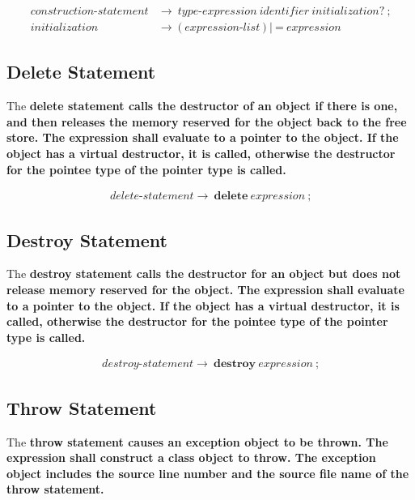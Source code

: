 \documentclass[a4paper,oneside,11pt]{article}
\begin{document}
\begin{align*}
construction\textrm{-}statement &\rightarrow \> \hyperref[typeexpr]{type\textrm{-}expression} \>
\hyperref[identifier]{identifier} \> initialization? \> \texttt{;}\\
initialization &\rightarrow \> \texttt{(} \> \hyperref[expressionlist]{expression\textrm{-}list} \> \texttt{)} \> | \> \texttt{=} \> \hyperref[expression]{expression}
\end{align*}

\subsection{Delete Statement}\label{deletestatement}

The \bf{delete} statement calls the destructor of an object if there is one, and then releases the memory reserved for the object back to the free store.
The expression shall evaluate to a pointer to the object.
If the object has a virtual destructor, it is called, otherwise the destructor for the pointee type of the pointer type is called.

\begin{align*}
delete\textrm{-}statement \rightarrow \> \textbf{delete} \> \hyperref[expression]{expression} \> \texttt{;}
\end{align*}

\subsection{Destroy Statement}\label{destroystatement}

The \bf{destroy} statement calls the destructor for an object but does not release memory reserved for the object.
The expression shall evaluate to a pointer to the object.
If the object has a virtual destructor, it is called, otherwise the destructor for the pointee type of the pointer type is called.

\begin{align*}
destroy\textrm{-}statement \rightarrow \> \textbf{destroy} \> \hyperref[expression]{expression} \> \texttt{;}
\end{align*}

\subsection{Throw Statement}\label{throwstatement}

The \bf{throw} statement causes an exception object to be thrown. The expression shall construct a class object to throw.
The exception object includes the source line number and the source file name of the throw statement.
\end{document}
